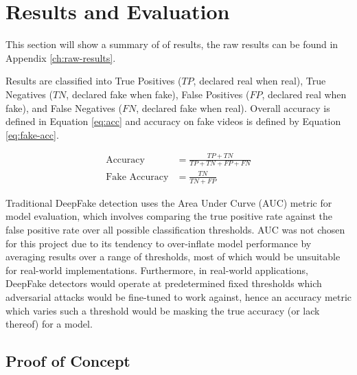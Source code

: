 \chapter{Results and Evaluation}
\label{ch:evaluation}

This section will show a summary of of results, the raw results can be found in Appendix \ref{ch:raw-results}. 

Results are classified into True Positives ($TP$, declared real when real), True Negatives ($TN$, declared fake when fake), False Positives ($FP$, declared real when fake), and False Negatives ($FN$, declared fake when real). Overall accuracy is defined in Equation \ref{eq:acc} and accuracy on fake videos is defined by Equation \ref{eq:fake-acc}.

\begin{align}
    \text{Accuracy} &= \frac{TP+TN}{TP+TN+FP+FN} \label{eq:acc} \\
    \text{Fake Accuracy} &= \frac{TN}{TN+FP} \label{eq:fake-acc}
\end{align}

Traditional DeepFake detection uses the Area Under Curve (AUC) metric for model evaluation, which involves comparing the true positive rate against the false positive rate over all possible classification thresholds. AUC was not chosen for this project due to its tendency to over-inflate model performance by averaging results over a range of thresholds, most of which would be unsuitable for real-world implementations\cite{ricker2022towards}. Furthermore, in real-world applications, DeepFake detectors would operate at predetermined fixed thresholds which adversarial attacks would be fine-tuned to work against, hence an accuracy metric which varies such a threshold would be masking the true accuracy (or lack thereof) for a model.

\section{Proof of Concept}
\label{sec:concept-results}



